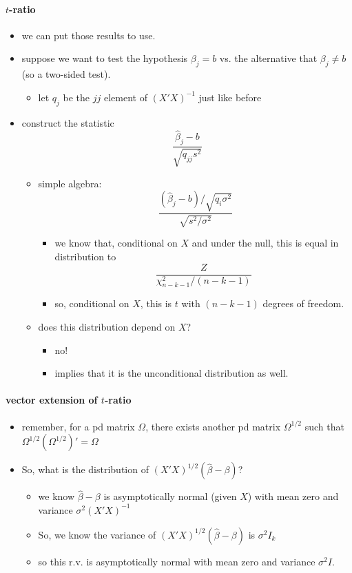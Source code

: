 \paragraph{$t$-ratio}
\label{sec-3-3-4}

\begin{itemize}
\item we can put those results to use.
\item suppose we want to test the hypothesis $\beta_j = b$ vs. the
        alternative that $\beta_j \neq b$ (so a two-sided test).
\begin{itemize}
\item let $q_j$ be the $jj$ element of $(X'X)^{-1}$ just like before
\end{itemize}
\item construct the statistic
        \[ \frac{\hat\beta_j - b}{\sqrt{q_{jj} s^2}} \]
\begin{itemize}
\item simple algebra:
          \[ \frac{(\hat\beta_j - b)/\sqrt{q_i \sigma^2}}{\sqrt{s^2/\sigma^2}} \]
\begin{itemize}
\item we know that, conditional on $X$ and under the null, this is
            equal in distribution to
            \[ \frac{Z}{\chi^2_{n-k-1} / (n-k-1)} \]
\item so, conditional on $X$, this is $t$ with $(n-k-1)$ degrees
            of freedom.
\end{itemize}
\item does this distribution depend on $X$?
\begin{itemize}
\item no!
\item implies that it is the unconditional distribution as well.
\end{itemize}
\end{itemize}
\end{itemize}
\paragraph{vector extension of $t$-ratio}
\label{sec-3-3-5}

\begin{itemize}
\item remember, for a pd matrix $\Omega$, there exists another pd
        matrix $\Omega^{1/2}$ such that $\Omega^{1/2}(\Omega^{1/2})' =
        \Omega$
\item So, what is the distribution of $(X'X)^{1/2}(\hat\beta - \beta)$?
\begin{itemize}
\item we know $\hat\beta - \beta$ is asymptotically normal (given
          $X$) with mean zero and variance $\sigma^2 (X'X)^{-1}$
\item So, we know the variance of $(X'X)^{1/2}(\hat\beta - \beta)$
          is $\sigma^2 I_k$
\item so this r.v. is asymptotically normal with mean zero and
          variance $\sigma^2 I$.
\end{itemize}
\end{itemize}
